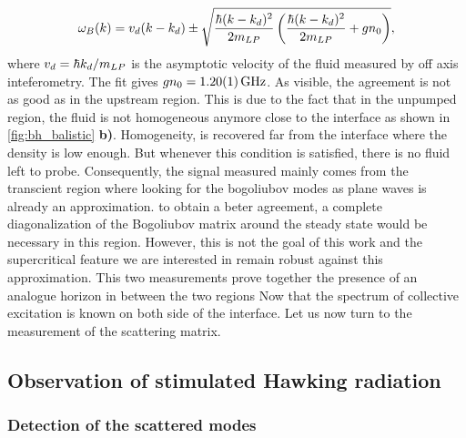 \begin{equation}
    \omega_B(k) = v_d(k-k_d) \pm \sqrt{\dfrac{\hbar (k-k_d)^2}{2m_{LP}} \left({\dfrac{\hbar (k-k_d)^2}{2m_{LP}}} + g n_0 \right)},
\end{equation}
where $v_d = \hbar k_d/m_{LP}$ is the asymptotic velocity of the fluid measured by off axis inteferometry. The fit gives $gn_0=\SI{1.2 \pm 0.01}{\giga \hertz}$. As visible, the agreement is not as good as in the upstream region. 
This is due to the fact that in the unpumped region, the fluid is not homogeneous anymore close to the interface as shown in \autoref{fig:bh_balistic} \textbf{b)}. Homogeneity,
is recovered far from the interface where the density is low enough. But whenever this condition is satisfied, there is no fluid left to probe.  Consequently, the signal measured mainly comes from the transcient region where looking for the bogoliubov modes as plane waves is already an approximation.
to obtain a beter agreement, a complete diagonalization of the Bogoliubov matrix around the steady state would be necessary in this region. However, this is not the goal of this work and the supercritical feature we are interested in
remain robust against this approximation.
This two measurements prove together the presence of an analogue horizon in between the two regions Now that the spectrum of collective excitation is known on both side of the 
interface. Let us now turn to the measurement of the scattering matrix.

\subsection{Observation of stimulated Hawking radiation}
\label{sec:scattering_matrix}

\subsubsection{Detection of the scattered modes}

